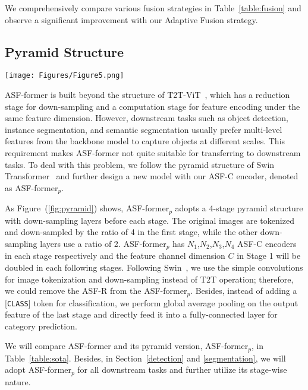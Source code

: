 \documentclass[lettersize,journal]{IEEEtran}
\begin{document}
We comprehensively compare various fusion strategies in Table~\ref{table:fusion} and observe a significant improvement with our Adaptive Fusion strategy.

\subsection{Pyramid Structure}
\label{pyramid}

\begin{figure*}
\centering
\texttt{[image: Figures/Figure5.png]}
\caption{The architecture of ASF-former$_p$. It adopts a 4-stage pyramid structure and is built based on ASF-C encoders. Without [{\tt CLASS}] token, the final output feature will be entirely fed into the classification layer after global average pooling.}
\label{fig:pyramid}
\end{figure*}

ASF-former is built beyond the structure of T2T-ViT~\cite{yuan2021tokens}, which has a reduction stage for down-sampling and a computation stage for feature encoding under the same feature dimension. However, downstream tasks such as object detection, instance segmentation, and semantic segmentation usually prefer multi-level features from the backbone model to capture objects at different scales. This requirement makes ASF-former not quite suitable for transferring to downstream tasks. To deal with this problem, we follow the pyramid structure of Swin Transformer~\cite{liu2021Swin} and further design a new model with our ASF-C encoder, denoted as ASF-former$_p$.

As Figure~(\ref{fig:pyramid}) shows, ASF-former$_p$ adopts a 4-stage pyramid structure with down-sampling layers before each stage. The original images are tokenized and down-sampled by the ratio of 4 in the first stage, while the other down-sampling layers use a ratio of 2. ASF-former$_p$ has $N_1$,$N_2$,$N_3$,$N_4$ ASF-C encoders in each stage respectively and the feature channel dimension $C$ in Stage 1 will be doubled in each following stages. Following Swin~\cite{liu2021Swin}, we use the simple convolutions for image tokenization and down-sampling instead of T2T operation; therefore, we could remove the ASF-R from the ASF-former$_p$. Besides, instead of adding a [{\tt CLASS}] token for classification, we perform global average pooling on the output feature of the last stage and directly feed it into a fully-connected layer for category prediction.

We will compare ASF-former and its pyramid version, ASF-former$_p$, in Table~\ref{table:sota}. Besides, in Section~\ref{detection} and \ref{segmentation}, we will adopt ASF-former$_p$ for all downstream tasks and further utilize its stage-wise nature.
\end{document}

